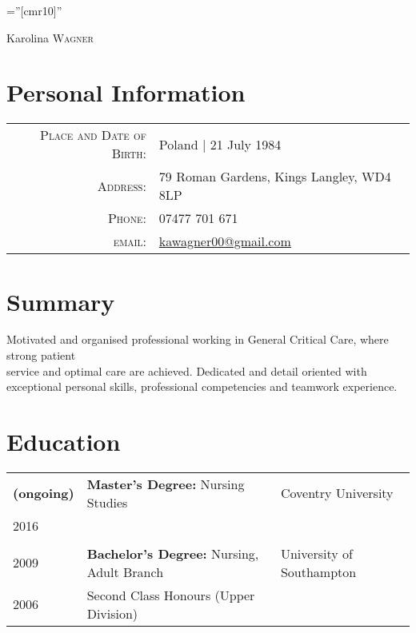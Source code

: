\documentclass[a4paper,10pt]{article}
\begin{document}
\pagestyle{empty} %

\font\fb=''[cmr10]'' %

\par{\centering
		{\Huge Karolina \textsc{Wagner}
	}\bigskip\par}


\section{Personal Information}

\begin{tabular}{rl}
    \textsc{Place and Date of Birth:} & Poland  | 21 July 1984 \\
    \textsc{Address:}   & 79 Roman Gardens, Kings Langley, WD4 8LP \\
    \textsc{Phone:}     & 07477 701 671\\
    \textsc{email:}     & \href{mailto:kawagner00@gmail.com}{kawagner00@gmail.com}
\end{tabular}

\section{Summary}
Motivated and organised professional working in General Critical Care, where strong patient \\
service and optimal care are achieved. Dedicated and detail oriented with \\
exceptional personal skills, professional competencies and teamwork experience. 

\section{Education}
\begin{tabular}{p{1.35cm}p{8cm}l}	
 \textbf{(ongoing)}  & \textbf{Master's Degree:} Nursing Studies & Coventry University \\
\textsc{2016} &  \\
\\
\textsc{2009} & \textbf{Bachelor's Degree:}  Nursing, Adult Branch & University of Southampton\\
\textsc{2006} &  Second Class Honours (Upper Division)  \\
\end{tabular}
\end{document}
